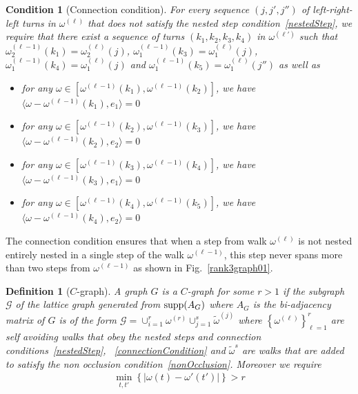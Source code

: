 \documentclass[12pt]{article}
\newtheorem{condition}{Condition}
\newtheorem{definition}{Definition}
\begin{document}
\begin{condition}[\label{connectionCondition}Connection condition]
For every sequence $(j,j',j'')$ of left-right-left turns in $\omega^{(\ell)}$ that does not satisfy the nested step condition~\ref{nestedStep},  we require that there exist a sequence of turns $(k_1,k_2,k_3,k_4)$ in $\omega^{(\ell')}$ such that $\omega_2^{(\ell-1)}(k_1) = \omega_2^{(\ell)}(j)$, $\omega_1^{(\ell-1)}(k_3) = \omega_1^{(\ell)}(j)$,   $\omega_1^{(\ell-1)}(k_4) = \omega_1^{(\ell)}(j)$ and $\omega_1^{(\ell-1)}(k_5) = \omega_1^{(\ell)}(j'')$ as well as 
\begin{itemize}
\item for any $\omega\in [\omega^{(\ell-1)}(k_1), \omega^{(\ell-1)}(k_2)]$, we have $\langle \omega-\omega^{(\ell-1)}(k_1), e_1\rangle  = 0$
\item for any $\omega\in [\omega^{(\ell-1)}(k_2), \omega^{(\ell-1)}(k_3)]$, we have $\langle \omega-\omega^{(\ell-1)}(k_2), e_2\rangle =0$
\item for any $\omega\in [\omega^{(\ell-1)}(k_3), \omega^{(\ell-1)}(k_4)]$, we have $\langle \omega-\omega^{(\ell-1)}(k_3), e_1\rangle =0$
\item for any $\omega\in [\omega^{(\ell-1)}(k_4), \omega^{(\ell-1)}(k_5)]$, we have $\langle \omega-\omega^{(\ell-1)}(k_4), e_2\rangle =0$
\end{itemize}
\end{condition}

The connection condition ensures that when a step from walk $\omega^{(\ell)}$ is not nested entirely nested in a single step of the walk $\omega^{(\ell-1)}$, this step never spans more than two steps from $\omega^{(\ell-1)}$ as shown in Fig.~\ref{rank3graph01}. 

\begin{definition}[$C$-graph]
A graph $G$ is a $C$-graph for some $r>1$ if the subgraph $\mathcal{G}$ of the lattice graph generated from $\text{\upshape supp}(A_G)$ where $A_G$ is the bi-adjacency matrix of $G$ is of the form $\mathcal{G} = \cup_{i=1}^r \omega^{(r)}\cup_{j=1}^{s}\tilde{\omega}^{(j)}$ where $\left\{\omega^{(\ell)}\right\}_{\ell=1}^r$ are self avoiding walks that obey the nested steps and connection conditions~\ref{nestedStep}, ~\ref{connectionCondition} and $\tilde{\omega}^{s}$ are walks that are added to satisfy the non occlusion condition~\ref{nonOcclusion}.  Moreover we require 
\begin{align}
\min_{t, t'}\left\{|\omega(t)- \omega'(t')| \right\} > r
\end{align}
\end{definition}
\end{document}
